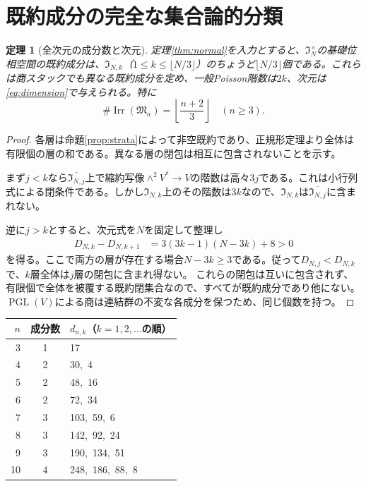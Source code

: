 \documentclass[11pt,a4paper]{ltjsarticle}
\newtheorem{theorem}{定理}[section]
\newcommand{\PGL}{\operatorname{PGL}}
\begin{document}
\section{既約成分の完全な集合論的分類}
\begin{theorem}[全次元の成分数と次元]\label{thm:classification}
定理\ref{thm:normal}を入力とすると、$\mathfrak I_N^\times$の基礎位相空間の既約成分は、$\overline{\mathfrak I_{N,k}}$（$1\le k\le\lfloor N/3\rfloor$）のちょうど$\lfloor N/3\rfloor$個である。これらは商スタックでも異なる既約成分を定め、一般Poisson階数は$2k$、次元は\eqref{eq:dimension}で与えられる。特に
\[
 \boxed{\quad\#\operatorname{Irr}(\mathfrak M_n)
 =\left\lfloor\frac{n+2}{3}\right\rfloor\quad(n\ge3).\quad}
\]
\end{theorem}
\begin{proof}
各層は命題\ref{prop:strata}によって非空既約であり、正規形定理より全体は有限個の層の和である。異なる層の閉包は相互に包含されないことを示す。

まず$j<k$なら$\overline{\mathfrak I_{N,j}}$上で縮約写像$\wedge^2V^*\to V$の階数は高々$3j$である。これは小行列式による閉条件である。しかし$\mathfrak I_{N,k}$上のその階数は$3k$なので、$\mathfrak I_{N,k}$は$\overline{\mathfrak I_{N,j}}$に含まれない。

逆に$j>k$とすると、次元式を$N$を固定して整理し
\begin{align*}
 D_{N,k}-D_{N,k+1}
 &=3(3k-1)(N-3k)+8>0
\end{align*}
を得る。ここで両方の層が存在する場合$N-3k\ge3$である。従って$D_{N,j}<D_{N,k}$で、$k$層全体は$j$層の閉包に含まれ得ない。
これらの閉包は互いに包含されず、有限個で全体を被覆する既約閉集合なので、すべてが既約成分であり他にない。$\PGL(V)$による商は連結群の不変な各成分を保つため、同じ個数を持つ。
\end{proof}
\begin{center}
\begin{tabular}{rcl}
\toprule
$n$ & 成分数 & $d_{n,k}$（$k=1,2,\ldots$の順）\\\midrule
3 &1&17\\
4 &2&30,\ 4\\
5 &2&48,\ 16\\
6 &2&72,\ 34\\
7 &3&103,\ 59,\ 6\\
8 &3&142,\ 92,\ 24\\
9 &3&190,\ 134,\ 51\\
10&4&248,\ 186,\ 88,\ 8\\\bottomrule
\end{tabular}
\end{center}
\end{document}
